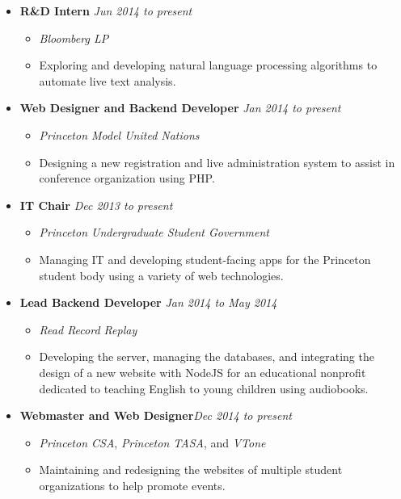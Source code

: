 \documentclass[11pt]{article}
\begin{document}
\begin{itemize}[nolistsep,topsep=0pt, label=]
\itemsep0.33em
\item \textbf{R\&D Intern}  \hfill \emph{Jun 2014 to present}
\begin{itemize}[nolistsep,topsep=0pt, label=]
\item \emph{Bloomberg LP} 
\item Exploring and developing natural language processing algorithms to automate live text analysis.
\end{itemize}

\item \textbf{Web Designer and Backend Developer} \hfill\emph{Jan 2014 to present}
\begin{itemize}[nolistsep,topsep=0pt, label=]
\item \emph{Princeton Model United Nations}  
\item Designing a new registration and live administration system to assist in conference organization using PHP.
\end{itemize}

\item \textbf{IT Chair}  \hfill \emph{Dec 2013 to present}
\begin{itemize}[nolistsep,topsep=0pt, label=]
\item \emph{Princeton Undergraduate Student Government} 
\item Managing IT and developing student-facing apps for the Princeton student body using a variety of web technologies.
\end{itemize}

\item \textbf{Lead Backend Developer}  \hfill\emph{Jan 2014 to May 2014}
\begin{itemize}[nolistsep,topsep=0pt, label=]
\item \emph{Read Record Replay}
\item Developing the server, managing the databases, and integrating the design of a new website with NodeJS for an educational nonprofit dedicated to teaching English to young children using audiobooks.
\end{itemize}

\item \textbf{Webmaster and Web Designer}\hfill \emph{Dec 2014 to present}
\begin{itemize}[nolistsep,topsep=0pt, label=]
\item \emph{Princeton CSA}, \emph{Princeton TASA}, and \emph{VTone}
\item Maintaining and redesigning the websites of multiple student organizations to help promote events.
\end{itemize}


\end{itemize}
\end{document}
